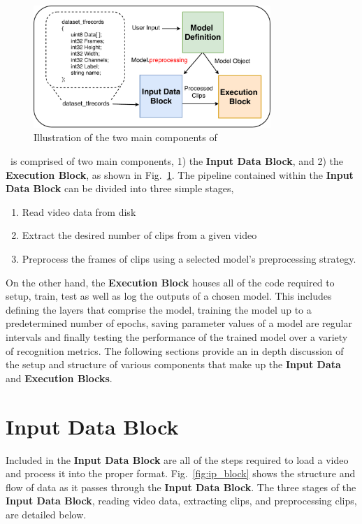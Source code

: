 \documentclass{llncs}
\begin{document}
\begin{figure}[b!]
\centering
\includegraphics[width=0.8\textwidth]{images/overview.pdf}
\caption{Illustration of the two main components of \acro}
\label{fig:overview}
\end{figure}

\acro~is comprised of two main components, 1) the \textbf{Input Data Block}, and 2) the \textbf{Execution Block}, as shown in Fig.~\ref{fig:overview}.
The pipeline contained within the \textbf{Input Data Block} can be divided into three simple stages,
\begin{enumerate}
\item Read video data from disk
\item Extract the desired number of clips from a given video
\item Preprocess the frames of clips using a selected model's preprocessing strategy.
\end{enumerate}
On the other hand, the \textbf{Execution Block} houses all of the code required to setup, train, test as well as log the outputs of a chosen model.
This includes defining the layers that comprise the model, training the model up to a predetermined number of epochs, saving parameter values of a model are regular intervals and finally testing the performance of the trained model over a variety of recognition metrics.
The following sections provide an in depth discussion of the setup and structure of various components that make up the \textbf{Input Data} and \textbf{Execution Blocks}.

\section{Input Data Block}
\label{sec:ipblock}
Included in the \textbf{Input Data Block} are all of the steps required to load a video and process it into the proper format.
Fig.~\ref{fig:ip_block} shows the structure and flow of data as it passes through the \textbf{Input Data Block}.
The three stages of the \textbf{Input Data Block}, reading video data, extracting clips, and preprocessing clips, are detailed below.
\end{document}
